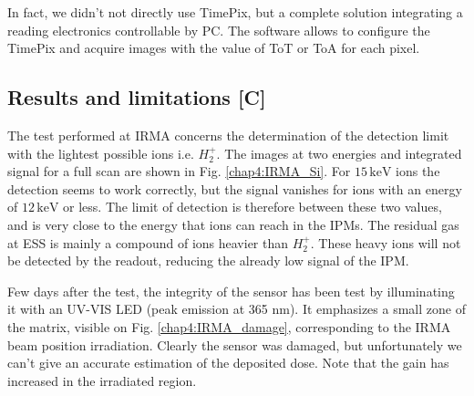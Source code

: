 \begin{refsection}
  In fact, we didn't not directly use TimePix, but a complete solution \cite{Kraus2011,advacam2019} integrating a reading electronics controllable by PC. The software allows to configure the TimePix and acquire images with the value of ToT or ToA for each pixel.

  

  \subsection{Results and limitations [C]}

  The test performed at IRMA concerns the determination of the detection limit with the lightest possible ions i.e. $H_{2}^{+}$. The images at two energies and integrated signal for a full scan are shown in Fig. \ref{chap4:IRMA_Si}. For $15\,\mathrm{keV}$ ions the detection seems to work correctly, but the signal vanishes for ions with an energy of $12\,\mathrm{keV}$ or less. The limit of detection is therefore between these two values, and is very close to the energy that ions can reach in the IPMs. The residual gas at ESS is mainly a compound of ions heavier than $H_{2}^{+}$. These heavy ions will not be detected by the readout, reducing the already low signal of the IPM.

  

  
  Few days after the test, the integrity of the sensor has been test by illuminating it with an UV-VIS LED (peak emission at 365 nm). It emphasizes a small zone of the matrix, visible on Fig. \ref{chap4:IRMA_damage}, corresponding to the IRMA  beam position irradiation. Clearly the sensor was damaged, but unfortunately we can't give an accurate estimation of the deposited dose. Note that the gain has increased in the irradiated region.


\end{refsection}
